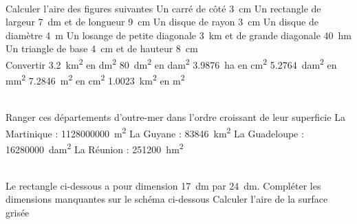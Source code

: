 \documentclass[../Cours.tex]{subfiles}
\begin{document}
\clearpage
\begin{questions}
    \exercice\\ Calculer l'aire des figures suivantes
        \question Un carré de côté \qty{3}{cm}
        \question Un rectangle de largeur \qty{7}{dm} et de longueur \qty{9}{cm}
        \question Un disque de rayon \qty{3}{cm}
        \question Un disque de diamètre \qty{4}{m}
        \question Un losange de petite diagonale \qty{3}{km} et de grande diagonale \qty{40}{hm}
        \question Un triangle de base \qty{4}{cm} et de hauteur \qty{8}{cm}
    \exercice\\ Convertir
        \question \qty{3,2}{km\squared} en \unit{dm\squared}
        \question \qty{80}{dm\squared} en \unit{dam\squared}
        \question \qty{3,9876}{ha} en \unit {cm\squared}
        \question \qty{5,2764}{dam\squared} en \unit{mm\squared}
        \question \qty{7,2846}{m\squared} en \unit {cm\squared}
        \question \qty{1,0023}{km\squared} en \unit{m\squared}
        
    \exercice\\ Ranger ces départements d'outre-mer dans l'ordre croissant de leur superficie
        \question La Martinique : \qty{1128000000}{m\squared}
        \question La Guyane : \qty{83846}{km\squared}
        \question La Guadeloupe : \qty{16280000}{dam\squared}
        \question La Réunion : \qty{251200}{hm\squared}
        
    \exercice\\
        Le rectangle ci-dessous a pour dimension \qty{17}{dm} par \qty{24}{dm}.
        \question Compléter les dimensions manquantes sur le schéma ci-dessous
        \question Calculer l'aire de la surface grisée
        
        \begin{center}
\end{center}
\end{questions}
\end{document}
